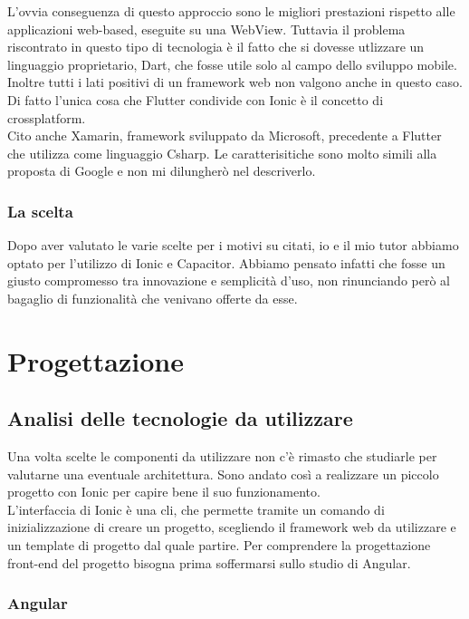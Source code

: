 L'ovvia conseguenza di questo approccio sono le migliori prestazioni rispetto alle applicazioni web-based, eseguite su una WebView.
Tuttavia il problema riscontrato in questo tipo di tecnologia è il fatto che si dovesse utlizzare un linguaggio proprietario, Dart, che
fosse utile solo al campo dello sviluppo mobile. Inoltre tutti i lati positivi di un framework web non valgono anche in questo caso. Di
fatto l'unica cosa che Flutter condivide con Ionic è il concetto di crossplatform. \\
Cito anche Xamarin, framework sviluppato da Microsoft, precedente a Flutter che utilizza come linguaggio \gls{Csharp}. Le
caratterisitiche sono molto simili alla proposta di Google e non mi dilungherò nel descriverlo.

\subsubsection{La scelta}

Dopo aver valutato le varie scelte per i motivi su citati, io e il mio tutor abbiamo optato per l'utilizzo di Ionic e Capacitor. Abbiamo
pensato infatti che fosse un giusto compromesso tra innovazione e semplicità d'uso, non rinunciando però al bagaglio di funzionalità che
venivano offerte da esse.

\section{Progettazione}

\subsection{Analisi delle tecnologie da utilizzare}

Una volta scelte le componenti da utilizzare non c'è rimasto che studiarle per valutarne una eventuale architettura. Sono andato così a
realizzare un piccolo progetto con Ionic per capire bene il suo funzionamento. \\
L'interfaccia di Ionic è una \gls{cli}, che permette tramite un comando di inizializzazione di creare un progetto, scegliendo il framework
web da utilizzare e un template di progetto dal quale partire. Per comprendere la progettazione front-end del progetto bisogna prima
soffermarsi sullo studio di Angular.

\subsubsection{Angular}


